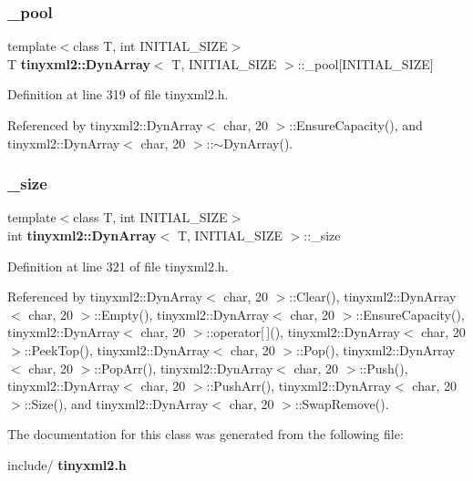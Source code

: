 \subsubsection{\_pool}
{\footnotesize\ttfamily template$<$class T, int I\+N\+I\+T\+I\+A\+L\+\_\+\+S\+I\+ZE$>$ \\
T \textbf{ tinyxml2\+::\+Dyn\+Array}$<$ T, I\+N\+I\+T\+I\+A\+L\+\_\+\+S\+I\+ZE $>$\+::\+\_\+pool[I\+N\+I\+T\+I\+A\+L\+\_\+\+S\+I\+ZE]\hspace{0.3cm}{\ttfamily [private]}}



Definition at line 319 of file tinyxml2.\+h.



Referenced by tinyxml2\+::\+Dyn\+Array$<$ char, 20 $>$\+::\+Ensure\+Capacity(), and tinyxml2\+::\+Dyn\+Array$<$ char, 20 $>$\+::$\sim$\+Dyn\+Array().

\mbox{\label{classtinyxml2_1_1_dyn_array_a40f0578cc1912eed17fb29f64daf6ae9}} 
\subsubsection{\_size}
{\footnotesize\ttfamily template$<$class T, int I\+N\+I\+T\+I\+A\+L\+\_\+\+S\+I\+ZE$>$ \\
int \textbf{ tinyxml2\+::\+Dyn\+Array}$<$ T, I\+N\+I\+T\+I\+A\+L\+\_\+\+S\+I\+ZE $>$\+::\+\_\+size\hspace{0.3cm}{\ttfamily [private]}}



Definition at line 321 of file tinyxml2.\+h.



Referenced by tinyxml2\+::\+Dyn\+Array$<$ char, 20 $>$\+::\+Clear(), tinyxml2\+::\+Dyn\+Array$<$ char, 20 $>$\+::\+Empty(), tinyxml2\+::\+Dyn\+Array$<$ char, 20 $>$\+::\+Ensure\+Capacity(), tinyxml2\+::\+Dyn\+Array$<$ char, 20 $>$\+::operator[$\,$](), tinyxml2\+::\+Dyn\+Array$<$ char, 20 $>$\+::\+Peek\+Top(), tinyxml2\+::\+Dyn\+Array$<$ char, 20 $>$\+::\+Pop(), tinyxml2\+::\+Dyn\+Array$<$ char, 20 $>$\+::\+Pop\+Arr(), tinyxml2\+::\+Dyn\+Array$<$ char, 20 $>$\+::\+Push(), tinyxml2\+::\+Dyn\+Array$<$ char, 20 $>$\+::\+Push\+Arr(), tinyxml2\+::\+Dyn\+Array$<$ char, 20 $>$\+::\+Size(), and tinyxml2\+::\+Dyn\+Array$<$ char, 20 $>$\+::\+Swap\+Remove().



The documentation for this class was generated from the following file\+:\begin{DoxyCompactItemize}
\item 
include/\textbf{ tinyxml2.\+h}\end{DoxyCompactItemize}
